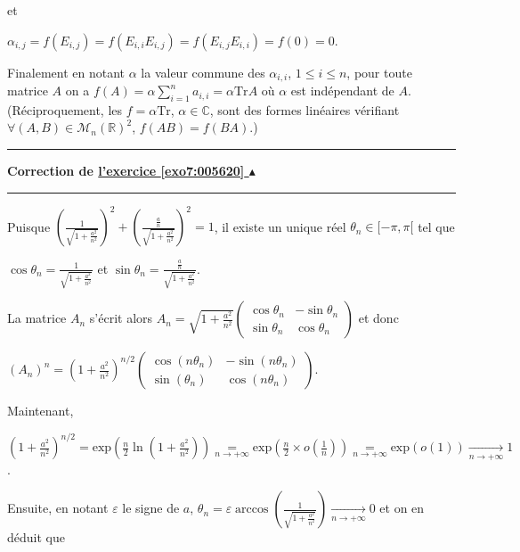 \documentclass[11pt,a4paper]{article}
\newcommand{\Rr}{\mathbb{R}} \newcommand{\R}{\mathbb{R}}
\newcommand{\Cc}{\mathbb{C}} \newcommand{\C}{\mathbb{C}}
\newcommand{\Arccos}{\mathop{\mathrm{arccos}}\nolimits}
\newcounter{exo}
\newcommand{\correction}[1]{\hypertarget{cor7:#1}{}\label{cor7:#1}{\bf Correction de \hyperlink{exo7:#1}{l'exercice \ref{exo7:#1} $\blacktriangle$}}\vspace{1mm}\hrule\vspace{1mm}}
\newcommand{\fincorrection}{\vspace{1mm}\hrule\vspace*{7mm}}
\begin{document}
et

\begin{center}
$\alpha_{i,j}=f(E_{i,j}) = f(E_{i,i}E_{i,j}) = f(E_{i,j}E_{i,i}) =f(0) =0$.
\end{center}

Finalement en notant $\alpha$ la valeur commune des $\alpha_{i,i}$, $1\leqslant i\leqslant n$, pour toute matrice $A$ on a $f(A)=\alpha\sum_{i=1}^{n}a_{i,i}=\alpha\text{Tr}A$ où $\alpha$ est indépendant de $A$. (Réciproquement, les $f=\alpha\text{Tr}$, $\alpha\in\Cc$, sont des formes linéaires vérifiant $\forall(A,B)\in\mathcal{M}_n(\Rr)^2$, $f(AB)=f(BA)$.)
\fincorrection
\correction{005620}
 Puisque $\left(\frac{1}{\sqrt{1+\frac{a^2}{n^2}}}\right)^2+\left(\frac{\frac{a}{n}}{\sqrt{1+\frac{a^2}{n^2}}}\right)^2=1$, il existe un unique réel $\theta_n\in[-\pi,\pi[$ tel que

\begin{center}
$\cos\theta_n=\frac{1}{\sqrt{1+\frac{a^2}{n^2}}}$ et $\sin\theta_n=\frac{\frac{a}{n}}{\sqrt{1+\frac{a^2}{n^2}}}$.
\end{center}

La matrice $A_n$ s'écrit alors $A_n=\sqrt{1+\frac{a^2}{n^2}}\left(
\begin{array}{cc}
\cos\theta_n&-\sin\theta_n\\
\sin\theta_n&\cos\theta_n
\end{array}
\right)$ et donc

\begin{center}
$(A_n)^n=\left(1+\frac{a^2}{n^2}\right)^{n/2}\left(
\begin{array}{cc}
\cos(n\theta_n)&-\sin(n\theta_n)\\
\sin(\theta_n)&\cos(n\theta_n)
\end{array}
\right)$.
\end{center}

Maintenant, 

\begin{center}
$\left(1+\frac{a^2}{n^2}\right)^{n/2}=\text{exp}\left(\frac{n}{2}\ln\left(1+\frac{a^2}{n^2}\right)\right)\underset{n\rightarrow+\infty}{=}\text{exp}\left(\frac{n}{2}\times o\left(\frac{1}{n}\right)\right)\underset{n\rightarrow+\infty}{=}\text{exp}(o(1))\underset{n\rightarrow+\infty}{\rightarrow}1$.
\end{center}

Ensuite, en notant $\varepsilon$ le signe de $a$, $\theta_n=\varepsilon\Arccos\left(\frac{1}{\sqrt{1+\frac{a^2}{n^2}}}\right)\underset{n\rightarrow+\infty}{\rightarrow}0$ et on en déduit que
\end{document}
